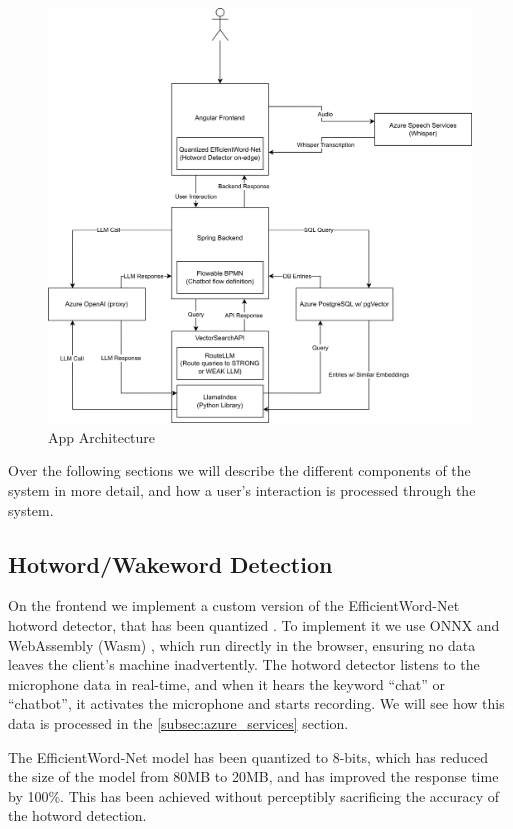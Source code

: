 \documentclass[a4paper,12pt,twoside]{ThesisStyle}
\begin{document}
\begin{figure}[htb]
\label{fig:architecture}
  \centering
\includegraphics[width=1\textwidth]{imatges/Full DSO App Architecture.drawio.png}
\caption{App Architecture}
\end{figure}

Over the following sections we will describe the different components of the system in more detail, and how a user's interaction is processed through the system.

\subsection{Hotword/Wakeword Detection}
On the frontend we implement a custom version of the EfficientWord-Net \cite{Chidhambararajan2022EfficientWordNet} hotword detector, that has been quantized \cite{Zhang2023PostTrainingQuantizationNeuralNetworks}. To implement it we use ONNX \cite{onnx} and WebAssembly (Wasm) \cite{wasm}, which run directly in the browser, ensuring no data leaves the client's machine inadvertently. The hotword detector listens to the microphone data in real-time, and when it hears the keyword ``chat'' or ``chatbot'', it activates the microphone and starts recording. We will see how this data is processed in the \ref{subsec:azure_services} section.

The EfficientWord-Net model has been quantized to 8-bits, which has reduced the size of the model from 80MB to 20MB, and has improved the response time by 100\%. This has been achieved without perceptibly sacrificing the accuracy of the hotword detection.
\end{document}
